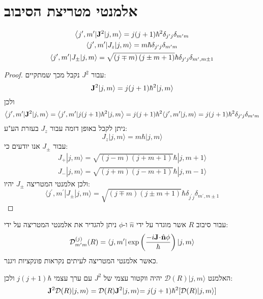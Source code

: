 \documentclass{tstextbook}
\begin{document}
\section{אלמנטי מטריצת הסיבוב}

\begin{proposition}
\begin{gather*}\left\langle  j^{\prime},m^{\prime}|{\bf J}^{2}|j,m \right\rangle=j(j+1)\hbar^{2}\delta_{j^{\prime}j}\delta_{m^{\prime}m}\\\left\langle  j^{\prime},m^{\prime}|J_{z}|j,m \right\rangle=m\hbar\delta_{j^{\prime}j}\delta_{m^{\prime}m}\\ \left\langle  j^{\prime},m^{\prime}|J_{\pm}|j,m \right\rangle=\sqrt{\left( j\mp m \right)\left( j\pm m+1 \right)}\hbar\delta_{j^{\prime}j}\delta_{m^{\prime},m\pm1} 
\end{gather*}

\end{proposition}
\begin{proof}
עבור \(J^{2}\) נקבל מכך שמתקיים:
$${\bf J}^{2}|j,m\rangle=j(j+1)\hbar^{2}|j,m\rangle$$
ולכן
$$ \left\langle  j^{\prime},m^{\prime}|{\bf J}^{2}|j,m \right\rangle=\left\langle  j^{\prime},m^{\prime}|j(j+1)\hbar^{2}|j,m \right\rangle=j(j+1)\hbar^{2} \langle j^{\prime},m^{\prime}| j,m \rangle=j(j+1)\hbar^{2}\delta_{j^{\prime}j}\delta_{m^{\prime}m}$$
ניתן לקבל באופן דומה עבור \(J_{z}\) בעזרת הע"ע:
$$J_{z}|j,m\rangle=m\hbar|j,m\rangle$$
עבור \(J_{\pm}\) אנו יודעים כי:
\begin{gather*}J_{+}|j,m\rangle=\sqrt{(j-m)(j+m+1)}\hbar|j,m+1\rangle\\ J_{-}|j,m\rangle=\sqrt{(j+m)(j-m+1)}\hbar|j,m-1\rangle 
\end{gather*}
ולכן אלמנטי המטריצה \(J_{\pm}\) יהיו:
$$\langle j^{\prime},m^{\prime}|J_{\pm}|j,m\rangle=\sqrt{(j\mp m)(j\pm m+1)}\hbar\delta_{j^{\prime}j}\delta_{m^{\prime},m\pm1}$$

\end{proof}
\begin{definition}
עבור סיבוב \(R\) אשר מוגדר על ידי \(\hat{n}\) ו-\(\phi\) ניתן להגדיר את אלמנטי המטריצה על ידי:
$${\mathcal{D}}_{m^{\prime}m}^{(j)}(R)=\langle j,m^{\prime}|\exp\left(\frac{-i{\bf J}\!\cdot\!{\hat{\bf n}}\phi}{\hbar}\right)|j,m\rangle$$
כאשר אלמנטי המטריצה לעיתים נקראות פונקציות ויגנר. 

\end{definition}
\begin{proposition}
האלמנט \({\mathcal{D}}(R)|j,m\rangle\) יהיה ווקטור עצמי של \(J^{2}\) עם ערך עצמי \(j(j+1)\hbar\) ולכן:
$${{{\bf J}^{2}\mathcal{D}(R)|j,m\rangle=\mathcal{D}(R){\bf J}^{2}|j,m\rangle}} {{=j(j+1)\hbar^{2}[\mathcal{D}(R)|j,m\rangle]}}$$

\end{proposition}
\end{document}
